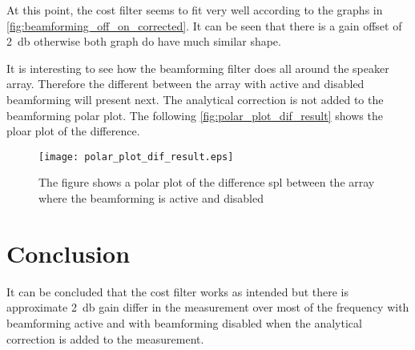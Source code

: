 At this point, the cost filter seems to fit very well according to the graphs in \autoref{fig:beamforming_off_on_corrected}. It can be seen that there is a gain offset of \SI{2}{\decibel} otherwise both graph do have much similar shape. 

It is interesting to see how the beamforming filter does all around the speaker array. Therefore the different between the array with active and disabled beamforming will present next. The analytical correction is not added to the beamforming polar plot. The following \autoref{fig:polar_plot_dif_result} shows the ploar plot of the difference. 


 \begin{figure}[H]
	\centering
	\texttt{[image: polar\_plot\_dif\_result.eps]}
	\caption{The figure shows a polar plot of the difference \gls{spl} between the array where the beamforming is active and disabled}
		\label{fig:polar_plot_dif_result}
\end{figure}




\section{Conclusion}
It can be concluded that the cost filter works as intended but there is approximate \SI{2}{\decibel} gain differ in the measurement over most of the frequency with beamforming active and with beamforming disabled when the analytical correction is added to the measurement. 


